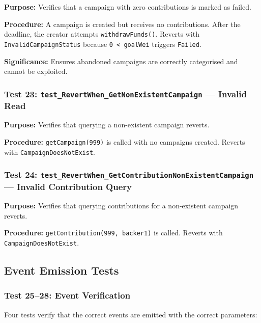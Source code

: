 \textbf{Purpose:} Verifies that a campaign with zero contributions is marked as failed.

\textbf{Procedure:} A campaign is created but receives no contributions. After the deadline, the creator attempts \texttt{withdrawFunds()}. Reverts with \texttt{InvalidCampaignStatus} because \texttt{0 < goalWei} triggers \texttt{Failed}.

\textbf{Significance:} Ensures abandoned campaigns are correctly categorised and cannot be exploited.

\subsubsection{Test 23: \texttt{test\_RevertWhen\_GetNonExistentCampaign} --- Invalid Read}

\textbf{Purpose:} Verifies that querying a non-existent campaign reverts.

\textbf{Procedure:} \texttt{getCampaign(999)} is called with no campaigns created. Reverts with \texttt{CampaignDoesNotExist}.

\subsubsection{Test 24: \texttt{test\_RevertWhen\_GetContributionNonExistentCampaign} --- Invalid Contribution Query}

\textbf{Purpose:} Verifies that querying contributions for a non-existent campaign reverts.

\textbf{Procedure:} \texttt{getContribution(999, backer1)} is called. Reverts with \texttt{CampaignDoesNotExist}.

\subsection{Event Emission Tests}

\subsubsection{Test 25--28: Event Verification}

Four tests verify that the correct events are emitted with the correct parameters:

